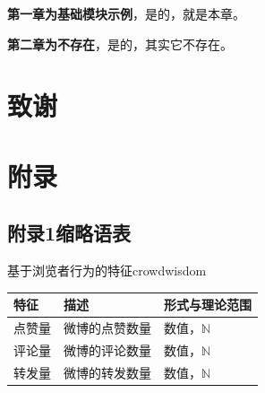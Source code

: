 \documentclass[a4paper,AutoFakeBold,oneside,12pt]{book}
\begin{document}
{{\begin{description}
\item \textbf{第一章为基础模块示例}，是的，就是本章。
\item \textbf{第二章为不存在}，是的，其实它不存在。
\end{description}

\clearpage{}


\clearpage{}
\chapter*{致\qquad{}谢}
\normalsize\thankwords

\setcounter{figure}{0} 
\renewcommand{\thefigure}{~附-\arabic{figure}~}
\setcounter{equation}{0} 
\renewcommand{\theequation}{~附-\arabic{equation}~}
\setcounter{table}{0} 
\renewcommand{\thetable}{~附-\arabic{table}~}

\chapter*{附\qquad{}录}

{}
\section*{附录1\quad{}缩略语表}

\begin{bupttable}{基于浏览者行为的特征}{crowdwisdom}
    \begin{tabular}{l|l|l}
		\hline \textbf{特征} & \textbf{描述} & \textbf{形式与理论范围}\\
		\hline 点赞量 & 微博的点赞数量 & 数值，$\mathbb{N}$ \\
		\hline 评论量 & 微博的评论数量 & 数值，$\mathbb{N}$ \\
		\hline 转发量 & 微博的转发数量 & 数值，$\mathbb{N}$ \\
		\hline
    \end{tabular}
\end{bupttable}

}}
\end{document}
